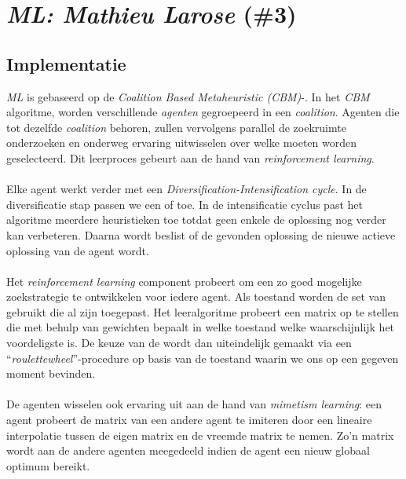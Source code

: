 \section{\emph{ML: Mathieu Larose} (\#3)}

\subsection{Implementatie}
\emph{ML}\cite{chesc-ml} is gebaseerd op de \emph{Coalition Based Metaheuristic (CBM)}-\abmh{}\cite{chesc-ml2}. In het \emph{CBM} algoritme, worden verschillende \emph{agenten} gegroepeerd in een \emph{coalition}. Agenten die tot dezelfde \emph{coalition} behoren, zullen vervolgens parallel de zoekruimte onderzoeken en onderweg ervaring uitwisselen over welke \abhn{} moeten worden geselecteerd. Dit leerproces gebeurt aan de hand van \emph{reinforcement learning}\cite{rlaiacaml}.

\paragraph{}
Elke agent werkt verder met een \emph{Diversification-Intensification cycle}. In de diversificatie stap passen we een \abmt{} of \abrr{} \abllh{} toe. In de intensificatie cyclus past het algoritme meerdere \abls{} heuristieken toe totdat geen enkele \abls{} \abh{} de oplossing nog verder kan verbeteren. Daarna wordt beslist of de gevonden oplossing de nieuwe actieve oplossing van de agent wordt.

\paragraph{}
Het \emph{reinforcement learning} component probeert om een zo goed mogelijke zoekstrategie te ontwikkelen voor iedere agent. Als toestand worden de set van \abllhn{} gebruikt die al zijn toegepast. Het leeralgoritme probeert een matrix op te stellen die met behulp van gewichten bepaalt in welke toestand welke \abh{} waarschijnlijk het voordeligste is. De keuze van de \abh{} wordt dan uiteindelijk gemaakt via een ``\emph{roulettewheel}''-procedure\cite{DBLP:journals/corr/abs-1109-3627} op basis van de toestand waarin we ons op een gegeven moment bevinden.

\paragraph{}
De agenten wisselen ook ervaring uit aan de hand van \emph{mimetism learning}\cite{655072}: een agent probeert de matrix van een andere agent te imiteren door een lineaire interpolatie tussen de eigen matrix en de vreemde matrix te nemen. Zo'n matrix wordt aan de andere agenten meegedeeld indien de agent een nieuw globaal optimum bereikt.

